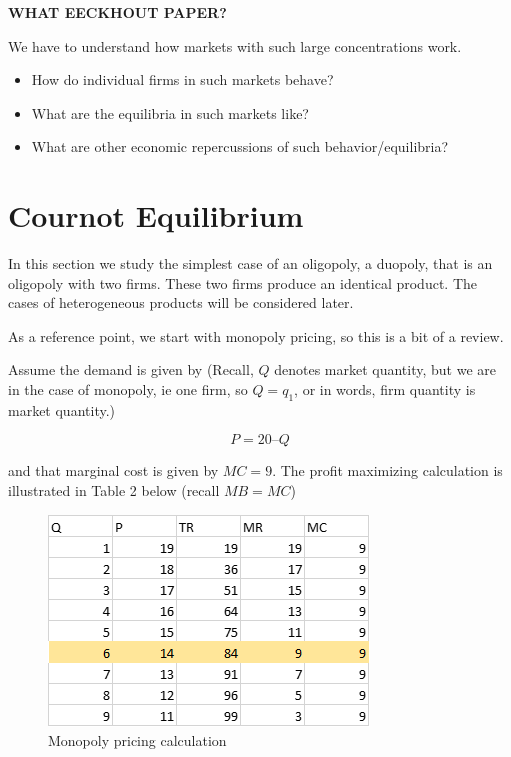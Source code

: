 \documentclass[
]{book}
\providecommand{\tightlist}{%
  \setlength{\itemsep}{0pt}\setlength{\parskip}{0pt}}
\begin{document}
\begin{addition}
\textbf{WHAT EECKHOUT PAPER?}

\end{addition}

We have to understand how markets with such large concentrations work.

\begin{itemize}
\tightlist
\item
  How do individual firms in such markets behave?
\item
  What are the equilibria in such markets like?
\item
  What are other economic repercussions of such behavior/equilibria?
\end{itemize}

\hypertarget{cournot-equilibrium}{%
\section{Cournot Equilibrium}\label{cournot-equilibrium}}

In this section we study the simplest case of an oligopoly, a duopoly, that is an oligopoly with two firms. These two firms produce an identical product. The cases of heterogeneous products will be considered later.

As a reference point, we start with monopoly pricing, so this is a bit of a review.

Assume the demand is given by (Recall, \(Q\) denotes market quantity, but we are in the case of monopoly, ie one firm, so \(Q=q_1\), or in words, firm quantity is market quantity.)

\[P = 20 – Q\]

and that marginal cost is given by \(MC = 9\). The profit maximizing calculation is illustrated in Table 2 below (recall \(MB=MC\))

\begin{figure}

{\centering \includegraphics[width=0.5\linewidth]{img/ch8/fig2} 

}

\caption{Monopoly pricing calculation}\label{fig:fig802}
\end{figure}
\end{document}
